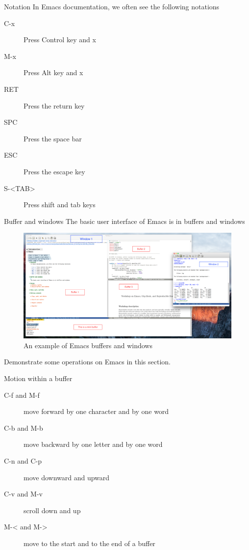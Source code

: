 \documentclass[presentation]{beamer}
\begin{document}
\begin{frame}[label={sec:org0c99707}]{Notation}
In Emacs documentation, we often see the following notations

\begin{description}
\item[{C-x}] Press Control key and x
\item[{M-x}] Press Alt key and x
\item[{RET}] Press the return key
\item[{SPC}] Press the space bar
\item[{ESC}] Press the escape key
\item[{S-<TAB>}] Press shift and tab keys
\end{description}
\end{frame}

\begin{frame}[label={sec:org1d9eabd}]{Buffer and windows}
The basic user interface of Emacs is in buffers and windows

\begin{figure}[htbp]
\centering
\includegraphics[width=1.0\textwidth,height=0.8\textheight]{figure/buffer_example.png}
\caption{An example of Emacs buffers and windows}
\end{figure}

\begin{NOTES}
Demonstrate some operations on Emacs in this section.
\end{NOTES}
\end{frame}

\begin{frame}[label={sec:org7666462}]{Motion within a buffer}
\begin{description}
\item[{C-f and M-f}] move forward by one character and by one word
\item[{C-b and M-b}] move backward by one letter and by one word
\item[{C-n and C-p}] move downward and upward
\item[{C-v and M-v}] scroll down and up
\item[{M-< and M->}] move to the start and to the end of a buffer
\end{description}
\end{frame}
\end{document}
